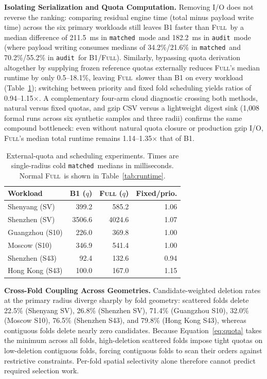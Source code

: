\documentclass[sigconf, nonacm]{acmart}
\newcommand{\full}{\textsc{Full}}
\newcommand{\matched}{\texttt{matched}}
\newcommand{\audit}{\texttt{audit}}
\begin{document}
\textbf{Isolating Serialization and Quota Computation.} Removing I/O does not reverse the ranking: comparing residual engine time (total minus payload write time) across the six primary workloads still leaves B1 faster than \full\ by a median difference of 211.5~ms in \matched\ mode and 182.2~ms in \audit\ mode (where payload writing consumes medians of 34.2\%/21.6\% in \matched\ and 70.2\%/55.2\% in \audit\ for B1/\full). Similarly, bypassing quota derivation altogether by supplying frozen reference quotas externally reduces \full's median runtime by only 0.5--18.1\%, leaving \full\ slower than B1 on every workload (Table~\ref{tab:quota}); switching between priority and fixed fold scheduling yields ratios of 0.94--1.15$\times$. A complementary four-arm cloud diagnostic crossing both methods, natural versus fixed quotas, and gzip CSV versus a lightweight digest sink (1{,}008 formal runs across six synthetic samples and three radii) confirms the same compound bottleneck: even without natural quota closure or production gzip I/O, \full's median total runtime remains 1.14--1.35$\times$ that of B1.

\begin{table}[t]
\caption{External-quota and scheduling experiments. Times are single-radius cold \matched\ medians in milliseconds. Normal \full\ is shown in Table~\ref{tab:runtime}.}
\label{tab:quota}\centering
\begin{tabular}{lrrr}\toprule
Workload & B1 ($q$) & \full{} ($q$) & Fixed/prio.\\\midrule
Shenyang (SV) & 399.2 & 585.2 & 1.06\\
Shenzhen (SV) & 3506.6 & 4024.6 & 1.07\\
Guangzhou (S10) & 226.0 & 369.8 & 1.00\\
Moscow (S10) & 346.9 & 541.4 & 1.00\\
Shenzhen (S43) & 92.4 & 132.6 & 0.94\\
Hong Kong (S43) & 100.0 & 167.0 & 1.15\\\bottomrule
\end{tabular}
\end{table}

\textbf{Cross-Fold Coupling Across Geometries.} Candidate-weighted deletion rates at the primary radius diverge sharply by fold geometry: scattered folds delete 22.5\% (Shenyang SV), 26.8\% (Shenzhen SV), 71.4\% (Guangzhou S10), 32.0\% (Moscow S10), 76.5\% (Shenzhen S43), and 79.8\% (Hong Kong S43), whereas contiguous folds delete nearly zero candidates. Because Equation~\ref{eq:quota} takes the minimum across all folds, high-deletion scattered folds impose tight quotas on low-deletion contiguous folds, forcing contiguous folds to scan their orders against restrictive constraints. Per-fold spatial selectivity alone therefore cannot predict required selection work.
\end{document}
